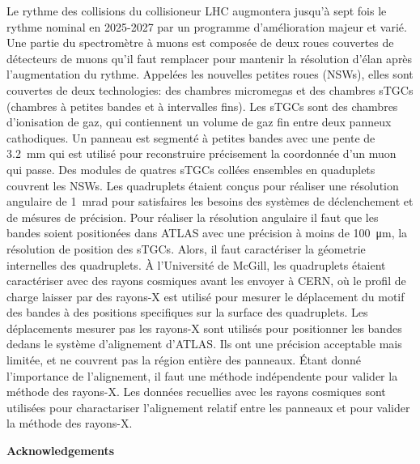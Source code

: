Le rythme des collisions du collisioneur LHC augmontera jusqu'\`{a} sept fois le rythme nominal en 2025-2027 par un programme d'am\'{e}lioration majeur et vari\'{e}. Une partie du spectrom\`{e}tre \`{a} muons est compos\'{e}e de deux roues couvertes de d\'{e}tecteurs de muons qu'il faut remplacer pour mantenir la r\'{e}solution d'\'{e}lan apr\`{e}s l'augmentation du rythme. Appel\'{e}es les nouvelles petites roues (NSWs), elles sont couvertes de deux technologies: des chambres micromegas et des chambres sTGCs (chambres \`{a} petites bandes et \`{a} intervalles fins). Les sTGCs sont des chambres d'ionisation de gaz, qui contiennent un volume de gaz fin entre deux panneux cathodiques. Un panneau est segment\'{e} \`{a} petites bandes avec une pente de \SI{3.2}{mm} qui est utilis\'{e} pour reconstruire pr\'{e}cisement la coordonn\'{e}e d'un muon qui passe. Des modules de quatres sTGCs coll\'{e}es ensembles en quaduplets couvrent les NSWs. Les quadruplets \'{e}taient con\c{c}us pour r\'{e}aliser une r\'{e}solution angulaire de \SI{1}{mrad} pour satisfaires les besoins des syst\`{e}mes de d\'{e}clenchement et de m\'{e}sures de pr\'{e}cision. Pour r\'{e}aliser la r\'{e}solution angulaire il faut que les bandes soient position\'{e}es dans ATLAS avec une pr\'{e}cision \`{a} moins de \SI{100}{\micro\meter}, la r\'{e}solution de position des sTGCs. Alors, il faut caract\'{e}riser la g\'{e}ometrie internelles des quadruplets. \`{A} l'Universit\'{e} de McGill, les quadruplets \'{e}taient caract\'{e}riser avec des rayons cosmiques avant les envoyer \`{a} CERN, o\`{u} le profil de charge laisser par des rayons-X est utilis\'{e} pour mesurer le d\'{e}placement du motif des bandes \`{a} des positions specifiques sur la surface des quadruplets. Les d\'{e}placements mesurer pas les rayons-X sont utilis\'{e}s pour positionner les bandes dedans le syst\`{e}me d'alignement d'ATLAS. Ils ont une pr\'{e}cision acceptable mais limit\'{e}e, et ne couvrent pas la r\'{e}gion enti\`{e}re des panneaux. \'{E}tant donn\'{e} l'importance de l'alignement, il faut une m\'{e}thode ind\'{e}pendente pour valider la m\'{e}thode des rayons-X. Les donn\'{e}es recuellies avec les rayons cosmiques sont utilis\'{e}es pour charactariser l'alignement relatif entre les panneaux et pour valider la m\'{e}thode des rayons-X.

\cleardoublepage


\begin{center}\textbf{Acknowledgements}\end{center}

